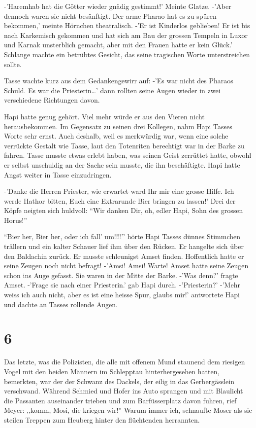 \documentclass[11pt,titlepage,a5paper]{book}
\begin{document}
-'Haremhab hat die Götter wieder gnädig gestimmt!' Meinte Glatze. -'Aber dennoch waren sie nicht besänftigt. Der arme Pharao hat es zu spüren bekommen,' meinte Hörnchen theatralisch. -'Er ist Kinderlos geblieben! Er ist bis nach Karkemisch gekommen und hat sich am Bau der grossen Tempeln in Luxor und Karnak unsterblich gemacht, aber mit den Frauen hatte er kein Glück.' Schlange machte ein betrübtes Gesicht, das seine tragischen Worte unterstreichen sollte.

Tasse wachte kurz aus dem Gedankengewirr auf: -'Es war nicht des Pharaos Schuld. Es war die Priesterin\dots' dann rollten seine Augen wieder in zwei verschiedene Richtungen davon.

Hapi hatte genug gehört. Viel mehr würde er aus den Vieren nicht herausbekommen. Im Gegensatz zu seinen drei Kollegen, nahm Hapi Tasses Worte sehr ernst. Auch deshalb, weil es merkwürdig war, wenn eine solche verrückte Gestalt wie Tasse, laut den Totenriten berechtigt war in der Barke zu fahren. Tasse musste etwas erlebt haben, was seinen Geist zerrüttet hatte, obwohl er selbst unschuldig an der Sache sein musste, die ihn beschäftigte. Hapi hatte Angst weiter in Tasse einzudringen.

-'Danke die Herren Priester, wie erwartet ward Ihr mir eine grosse Hilfe. Ich werde Hathor bitten, Euch eine Extrarunde Bier bringen zu lassen!' Drei der Köpfe neigten sich huldvoll: "`Wir danken Dir, oh, edler Hapi, Sohn des grossen Horus!"'

"`Bier her, Bier her, oder ich fall' um!!!!"' hörte Hapi Tasses dünnes Stimmchen trällern und ein kalter Schauer lief ihm über den Rücken. Er hangelte sich über den Baldachin zurück. Er musste schleunigst Amset finden. Hoffentlich hatte er seine Zeugen noch nicht befragt! -'Amsi! Amsi! Warte! Amset hatte seine Zeugen schon ins Auge gefasst. Sie waren in der Mitte der Barke. -'Was denn?' fragte Amset. -'Frage sie nach einer Priesterin.' gab Hapi durch. -'Priesterin?' -'Mehr weiss ich auch nicht, aber es ist eine heisse Spur, glaubs mir!' antwortete Hapi und dachte an Tasses rollende Augen.

 \section*{6}

Das letzte, was die Polizisten, die alle mit offenem Mund staunend dem riesigen Vogel mit den beiden Männern im Schlepptau hinterhergesehen  hatten, bemerkten, war der der Schwanz des Dackels, der eilig in das Gerbergässlein verschwand. Während Schmied und Hofer ins Auto sprangen und mit Blaulicht die Passanten auseinander trieben und zum Barfüsserplatz davon fuhren, rief Meyer: ,,komm, Mosi, die kriegen wir!'' Warum immer ich, schnaufte Moser als sie steilen Treppen zum Heuberg hinter den flüchtenden herrannten. 
\end{document}
